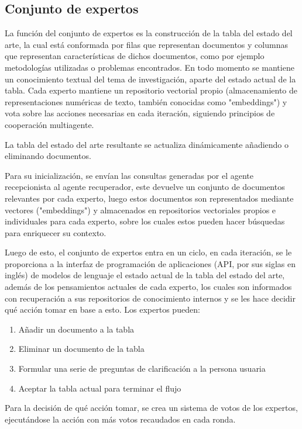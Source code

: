 \documentclass[12pt]{article}
\begin{document}
\subsection{Conjunto de expertos}
La función del conjunto de expertos es la construcción de la tabla del estado del arte, la cual está conformada por filas que representan documentos y columnas que representan características de dichos documentos, como por ejemplo metodologías utilizadas o problemas encontrados. En todo momento se mantiene un conocimiento textual del tema de investigación, aparte del estado actual de la tabla. Cada experto mantiene un repositorio vectorial propio (almacenamiento de representaciones numéricas de texto, también conocidas como "embeddings") y vota sobre las acciones necesarias en cada iteración, siguiendo principios de cooperación multiagente\cite{Stone2000MultiagentSA}.

La tabla del estado del arte resultante se actualiza dinámicamente añadiendo o eliminando documentos\cite{Lewis2020RetrievalAugmentedGF}.

Para su inicialización, se envían las consultas generadas por el agente recepcionista al agente recuperador, este devuelve un conjunto de documentos relevantes por cada experto, luego estos documentos son representados mediante vectores ("embeddings") y almacenados en repositorios vectoriales propios e individuales para cada experto, sobre los cuales estos pueden hacer búsquedas para enriquecer su contexto. 

Luego de esto, el conjunto de expertos entra en un ciclo, en cada iteración, se le proporciona a la interfaz de programación de aplicaciones (API, por sus siglas en inglés) de modelos de lenguaje el estado actual de la tabla del estado del arte, además de los pensamientos actuales de cada experto, los cuales son informados con recuperación a sus repositorios de conocimiento internos y se les hace decidir qué acción tomar en base a esto. Los expertos pueden:

\begin{enumerate}
    \item Añadir un documento a la tabla
    \item Eliminar un documento de la tabla
    \item Formular una serie de preguntas de clarificación a la persona usuaria
    \item Aceptar la tabla actual para terminar el flujo
\end{enumerate}

Para la decisión de qué acción tomar, se crea un sistema de votos de los expertos, ejecutándose la acción con más votos recaudados en cada ronda.
\end{document}
